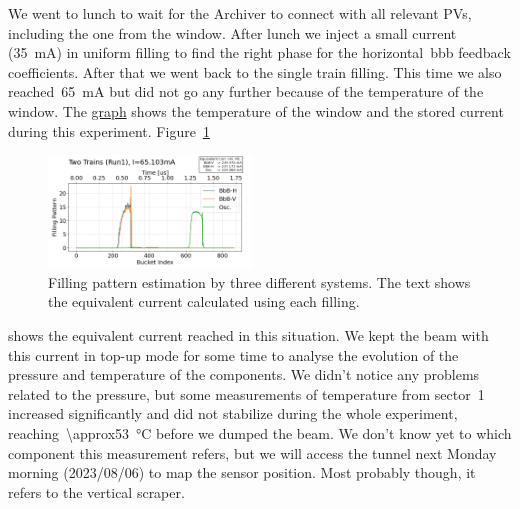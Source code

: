 \documentclass[a4paper,
               biblatex,     %
               ]{jacow}
\begin{document}
We went to lunch to wait for the Archiver to connect with all relevant PVs, including the one from the window. After lunch we inject a small current (\SI{35}{\milli\ampere}) in uniform filling to find the right phase for the horizontal~\gls{bbb} feedback coefficients. After that we went back to the single train filling. This time we also reached~\SI{65}{\milli\ampere} but did not go any further because of the temperature of the window. The \href{http://ais-eng-srv-ta.cnpem.br/archiver-viewer/?pv=optimized_800(SI-02SB%3ARF-P7Cav%3AGlassWinT-Mon)&pv=optimized_800(SI-Glob%3AAP-CurrInfo%3ACurrent-Mon)&from=2023-08-01T13%3A04%3A34.194Z&to=2023-08-01T21%3A04%3A34.194Z&ref=2023-08-03T19%3A20%3A55.734Z}{graph} shows the temperature of the window and the stored current during this experiment. Figure~\ref{fig:2023-08-01_onetrain_fill}
\begin{figure}
    \centering
    \includegraphics[width=0.48\textwidth]{2023-08-01_trains1_run3_curr65p103.png}
    \caption{Filling pattern estimation by three different systems. The text shows the equivalent current calculated using each filling.}
    \label{fig:2023-08-01_onetrain_fill}
\end{figure}
shows the equivalent current reached in this situation. We kept the beam with this current in top-up mode for some time to analyse the evolution of the pressure and temperature of the components. We didn't notice any problems related to the pressure, but some measurements of temperature from sector~\num{1} increased significantly and did not stabilize during the whole experiment, reaching~\SI{\approx53}{\celsius} before we dumped the beam. We don't know yet to which component this measurement refers, but we will access the tunnel next Monday morning (2023/08/06) to map the sensor position. Most probably though, it refers to the vertical scraper.
\end{document}
